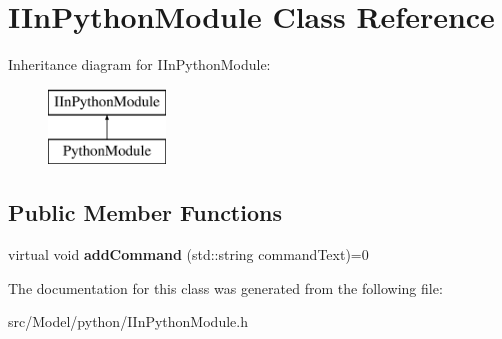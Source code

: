 \hypertarget{classIInPythonModule}{}\section{I\+In\+Python\+Module Class Reference}
\label{classIInPythonModule}
Inheritance diagram for I\+In\+Python\+Module\+:\begin{figure}[H]
\begin{center}
\leavevmode
\includegraphics[height=2.000000cm]{classIInPythonModule}
\end{center}
\end{figure}
\subsection*{Public Member Functions}
\begin{DoxyCompactItemize}
\item 
virtual void {\bfseries add\+Command} (std\+::string command\+Text)=0\hypertarget{classIInPythonModule_a5139355410f82de6b0accdf6221e9522}{}\label{classIInPythonModule_a5139355410f82de6b0accdf6221e9522}

\end{DoxyCompactItemize}


The documentation for this class was generated from the following file\+:\begin{DoxyCompactItemize}
\item 
src/\+Model/python/I\+In\+Python\+Module.\+h\end{DoxyCompactItemize}
